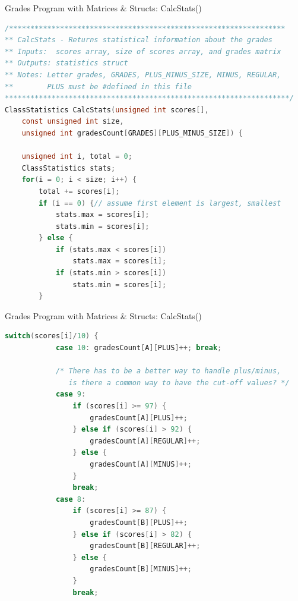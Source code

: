 \documentclass[graphics]{beamer}
\begin{document}
\begin{frame}[fragile]{Grades Program with Matrices \& Structs: CalcStats()}
    \begin{lstlisting}[language=C,basicstyle=\scriptsize,keywordstyle=\color{blue},commentstyle=\color{green},showstringspaces=false,stringstyle=\color{red}]
/*****************************************************************
** CalcStats - Returns statistical information about the grades
** Inputs:  scores array, size of scores array, and grades matrix
** Outputs: statistics struct
** Notes: Letter grades, GRADES, PLUS_MINUS_SIZE, MINUS, REGULAR,
**        PLUS must be #defined in this file
*******************************************************************/
ClassStatistics CalcStats(unsigned int scores[],
    const unsigned int size,
    unsigned int gradesCount[GRADES][PLUS_MINUS_SIZE]) {
    
    unsigned int i, total = 0;
    ClassStatistics stats;
    for(i = 0; i < size; i++) {
        total += scores[i];
        if (i == 0) {// assume first element is largest, smallest
            stats.max = scores[i];
            stats.min = scores[i];
        } else {
            if (stats.max < scores[i])
                stats.max = scores[i];
            if (stats.min > scores[i])
                stats.min = scores[i];
        }
    \end{lstlisting}
\end{frame}

\begin{frame}[fragile]{Grades Program with Matrices \& Structs: CalcStats()}
    \begin{lstlisting}[language=C,basicstyle=\scriptsize,keywordstyle=\color{blue},commentstyle=\color{green},showstringspaces=false,stringstyle=\color{red}]
        switch(scores[i]/10) {
            case 10: gradesCount[A][PLUS]++; break;
            
            /* There has to be a better way to handle plus/minus,
               is there a common way to have the cut-off values? */
            case 9:
                if (scores[i] >= 97) {
                    gradesCount[A][PLUS]++;
                } else if (scores[i] > 92) {
                    gradesCount[A][REGULAR]++;
                } else {
                    gradesCount[A][MINUS]++;
                }
                break;
            case 8:
                if (scores[i] >= 87) {
                    gradesCount[B][PLUS]++;
                } else if (scores[i] > 82) {
                    gradesCount[B][REGULAR]++;
                } else {
                    gradesCount[B][MINUS]++;
                }
                break;
    \end{lstlisting}
\end{frame}
\end{document}
